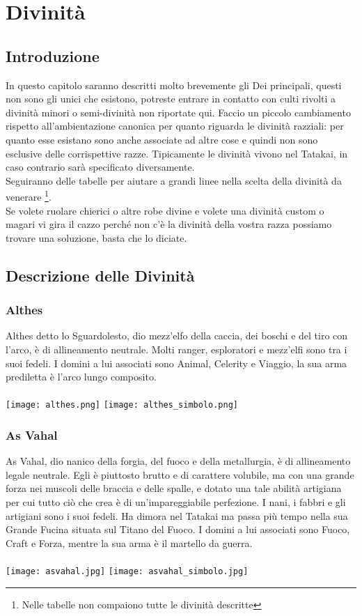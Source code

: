 \documentclass[a4paper]{report}
\begin{document}
\chapter{Divinità}
\begin{multicols}{2}
\section{Introduzione}
In questo capitolo saranno descritti molto brevemente gli Dei principali, questi non sono gli unici che esistono, potreste entrare in contatto con culti rivolti a divinità minori o semi-divinità non riportate qui.
Faccio un piccolo cambiamento rispetto all'ambientazione canonica per quanto riguarda le divinità razziali: per quanto esse esistano sono anche associate ad altre cose e quindi non sono esclusive delle corrispettive razze. Tipicamente le divinità vivono nel Tatakai, in caso contrario sarà specificato diversamente.\\
Seguiranno delle tabelle per aiutare a grandi linee nella scelta della divinità da venerare \footnote{Nelle tabelle non compaiono tutte le divinità descritte}.\\
Se volete ruolare chierici o altre robe divine e volete una divinità custom o magari vi gira il cazzo perché non c'è la divinità della vostra razza possiamo trovare una soluzione, basta che lo diciate.

\section{Descrizione delle Divinità}
\subsection*{Althes}
Althes detto lo Sguardolesto, dio mezz'elfo della caccia, dei boschi e del tiro con l'arco, è di allineamento neutrale. Molti ranger, esploratori e mezz'elfi sono tra i suoi fedeli. I domini a lui associati sono Animal, Celerity e Viaggio, la sua arma prediletta è l'arco lungo composito.\\
\\
\texttt{[image: althes.png]}
\texttt{[image: althes\_simbolo.png]}
\subsection*{As Vahal}
As Vahal, dio nanico della forgia, del fuoco e della metallurgia, è di allineamento legale neutrale. Egli è piuttosto brutto e di carattere volubile, ma con una grande forza nei muscoli delle braccia e delle spalle, e dotato una tale abilità artigiana per cui tutto ciò che crea è di un'impareggiabile perfezione. I nani, i fabbri e gli artigiani sono i suoi fedeli. Ha dimora nel Tatakai ma passa più tempo nella sua Grande Fucina situata sul Titano del Fuoco. I domini a lui associati sono Fuoco, Craft e Forza, mentre la sua arma è il martello da guerra.\\
\\
\texttt{[image: asvahal.jpg]}
\texttt{[image: asvahal\_simbolo.jpg]}

\end{multicols}
\end{document}
